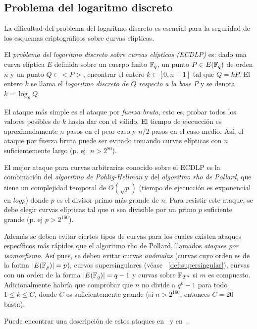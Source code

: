 \subsection{Problema del logaritmo discreto}
\label{sub:Problema del logaritmo discreto}

La dificultad del problema del logaritmo discreto es esencial para la seguridad de los esquemas criptográficos sobre curvas elípticas.

\begin{definicion}
    El \emph{problema del logaritmo discreto sobre curvas elípticas (ECDLP)} es: dado una curva elíptica $E$ definida sobre un cuerpo finito $\mathbb{F}_q$, un punto $P \in E(\mathbb{F}_q)$ de orden $n$ y un punto $Q \in <P>$, encontrar el entero $k \in [0, n - 1]$ tal que $Q = k P$. El entero $k$ se llama el \emph{logaritmo discreto de $Q$ respecto a la base $P$} y se denota $k = \log_p Q$.
\end{definicion}

El ataque más simple es el ataque por \emph{fuerza bruta}, esto es, probar todos los valores posibles de $k$ hasta dar con el válido. El tiempo de ejecucción es aproximadamente $n$ pasos en el peor caso y $n / 2$ pasos en el caso medio. Así, el ataque por fuerza bruta puede ser evitado tomando curvas elípticas con $n$ suficientemente largo (p. ej. $n > 2^{80}$).

El mejor ataque para curvas arbitrarias conocido sobre el ECDLP es la combinación del \emph{algoritmo de Pohlig-Hellman} y del \emph{algoritmo rho de Pollard}, que tiene un complejidad temporal de $O(\sqrt{p})$ (tiempo de ejecucción es exponencial en $log p$) donde $p$ es el divisor primo más grande de $n$. Para resistir este ataque, se debe elegir curvas elípticas tal que $n$ sea divisible por un primo $p$ suficiente grande (p. ej $p > 2^{160}$).

Además se deben evitar ciertos tipos de curvas para los cuales existen ataques específicos más rápidos que el algoritmo rho de Pollard, llamados \emph{ataques por isomorfismo}. Así pues, se deben evitar curvas \emph{anómalas} (curvas cuyo orden es de la forma $|E(\mathbb{F}_p)| = p$), curvas supersingulares (véase ~\ref{def:supersingular}), curvas con un orden de la forma $|E(\mathbb{F}_q)| = q - 1$ y curvas sobre $\mathbb{F}_{2^m}$ si $m$ es compuesto. Adicionalmente habría que comprobar que $n$ no divide a $q^k - 1$ para todo $1 \le k \le C$, donde $C$ es suficientemente grande (si $n > 2^{160}$, entonces $C = 20$ basta).

Puede encontrar una descripción de estos ataques en~\cite[cap. 4]{Hankerson:2003} y en~\cite[cap. 4]{Washington:2008}.

